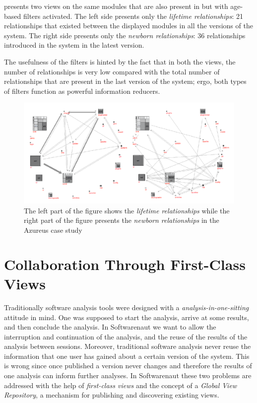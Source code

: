 \documentclass[preprint,12pt]{elsarticle}
\begin{document}
 presents two views on the same modules that are also present in  but with age-based filters activated. The left side presents only the {\em lifetime relationships}: 21 relationships that existed between the displayed modules in all the versions of the system. The right side presents only the {\em newborn relationships}: 36 relationships introduced in the system in the latest version. 

The usefulness of the filters is hinted by the fact that in both the views, the number of relationships is very low compared with the total number of relationships that are present in the last version of the system; ergo, both types of filters function as powerful information reducers.

\begin{figure}
\begin{center}
\includegraphics[width=\linewidth]{Architecture-LifetimeVsRecent}
\caption{The left part of the figure shows the {\em lifetime relationships} while the right part of the figure presents the {\em newborn relationships} in the Azureus case study}
\end{center}
\end{figure}

\section {Collaboration Through First-Class Views} 

Traditionally software analysis tools were designed with a {\em analysis-in-one-sitting} attitude  in mind. One was supposed to start the analysis, arrive at some results, and then conclude the analysis. In Softwarenaut we want to allow the interruption and continuation of the analysis, and the reuse of the results of the analysis between sessions. Moreover, traditional software analysis never reuse the information that one user has gained about a certain version of the system. This is wrong since once published a version never changes and therefore the results of one analysis can inform further analyses. In Softwarenaut these two problems are addressed with the help of {\em first-class views} and the concept of a {\em Global View Repository}, a mechanism for publishing and discovering existing views.
\end{document}
